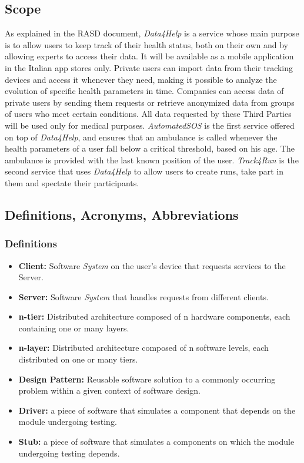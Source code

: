 \documentclass[titlepage]{article}
\begin{document}
\subsection{Scope}
As explained in the RASD document, {\it Data4Help} is a service whose main purpose is to allow users to keep track of their health status, both on their own and by allowing experts to access their data. It will be available as a mobile application in the Italian app stores only.
Private users can import data from their tracking devices and access it whenever they need, making it possible to analyze the evolution of specific health parameters in time.
Companies can access data of private users by sending them requests or retrieve anonymized data from groups of users who meet certain conditions. All data requested by these Third Parties will be used only for medical purposes.\newline
\newline
\textit{{\it AutomatedSOS}} is the first service offered on top of {\it Data4Help}, and ensures that an ambulance is called whenever the health parameters of a user fall below a critical threshold, based on his age. The ambulance is provided with the last known position of the user.\newline
\newline
\textit{{\it Track4Run}} is the second service that uses {\it Data4Help} to allow users to create runs, take part in them and spectate their participants. 

\subsection{Definitions, Acronyms, Abbreviations}


	\subsubsection{Definitions}
	
	\begin{itemize}
				\item {\bf Client: }Software {\it System} on the user’s device that requests services to the Server.
				\item {\bf Server: }Software {\it System} that handles requests from different clients.
				\item {\bf n-tier: }Distributed architecture composed of n hardware components, each containing one or many layers.
				\item {\bf n-layer: }Distributed architecture composed of n software levels, each distributed on one or many tiers.
				\item {\bf Design Pattern: }Reusable software solution to a commonly occurring problem within a given context of software design.
				\item {\bf Driver: }a piece of software that simulates a component that depends on the module undergoing testing.
				\item {\bf Stub: }a piece of software that simulates a components on which the module undergoing testing depends.
	\end{itemize}
	
\end{document}
